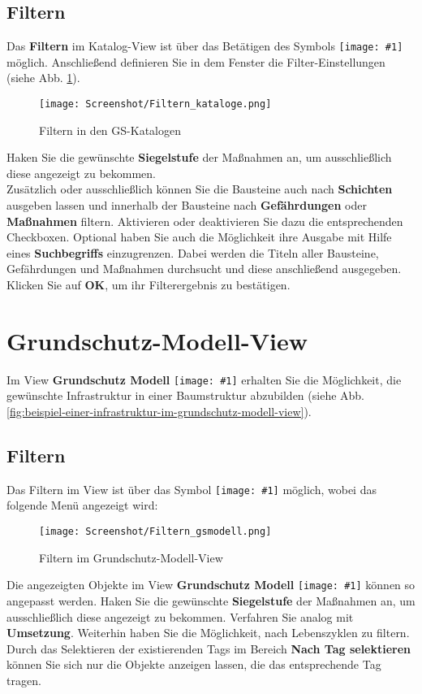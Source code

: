 \documentclass[a4paper,10pt]{book}
\newcommand{\icon}[1]{\texttt{[image: \#1]}}
\begin{document}
\subsection{Filtern}
Das \textbf{Filtern} im Katalog-View ist über das Betätigen des Symbols \icon{Icon/Filter.png} möglich.
Anschließend definieren Sie in dem Fenster die Filter-Einstellungen (siehe Abb. \ref{Filtern der GS-Kataloge}).
\newline
\begin{figure}[htb!]
  \centering
  \texttt{[image: Screenshot/Filtern\_kataloge.png]}
  \caption{\label{Filtern der GS-Kataloge} Filtern in den GS-Katalogen}
\end{figure}
\newline
Haken Sie die gewünschte \textbf{Siegelstufe} der Maßnahmen an, um ausschließlich diese angezeigt zu bekommen.
\newline\\
Zusätzlich oder ausschließlich können Sie die Bausteine auch nach \textbf{Schichten} ausgeben lassen und innerhalb der Bausteine nach \textbf{Gefährdungen}
oder \textbf{Maßnahmen} filtern. Aktivieren oder deaktivieren Sie dazu die entsprechenden Checkboxen. Optional haben Sie auch die Möglichkeit ihre
Ausgabe mit Hilfe eines \textbf{Suchbegriffs} einzugrenzen. Dabei werden die Titeln aller Bausteine, Gefährdungen und Maßnahmen durchsucht
und diese anschließend ausgegeben. Klicken Sie auf \textbf{OK}, um ihr Filterergebnis zu bestätigen.

\section{Grundschutz-Modell-View}

Im View \textbf{Grundschutz Modell}
\icon{Icon/GS_Modell.png} erhalten Sie die
Möglichkeit, die gewünschte Infrastruktur in einer Baumstruktur
abzubilden (siehe
Abb. \ref{fig:beispiel-einer-infrastruktur-im-grundschutz-modell-view}).


\subsection{Filtern}
Das Filtern im View ist über das Symbol \icon{Icon/Filter.png} möglich, wobei das folgende Menü angezeigt wird:
\newline
\begin{figure}[htb!]
  \centering
  \texttt{[image: Screenshot/Filtern\_gsmodell.png]}
  \caption{\label{Filtern im Grundschutz-Modell-View} Filtern im Grundschutz-Modell-View}
\end{figure}
\newline
Die angezeigten Objekte im View \textbf{Grundschutz Modell} \icon{Icon/GS_Modell.png} können so angepasst werden.
Haken Sie die gewünschte \textbf{Siegelstufe}
der Maßnahmen an, um ausschließlich diese angezeigt zu bekommen. Verfahren Sie analog mit \textbf{Umsetzung}. Weiterhin haben Sie die Möglichkeit,
nach Lebenszyklen zu filtern. Durch das Selektieren der existierenden Tags im Bereich \textbf{Nach Tag selektieren} können Sie sich nur die
Objekte anzeigen lassen, die das entsprechende Tag tragen.
\end{document}

